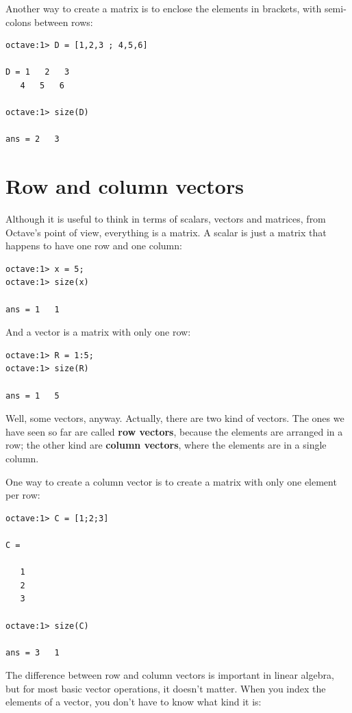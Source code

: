 \documentclass{book}
\begin{document}
Another way to create a matrix is to enclose the elements in
brackets, with semi-colons between rows:

\begin{verbatim}
octave:1> D = [1,2,3 ; 4,5,6]

D = 1   2   3
   4   5   6

octave:1> size(D)

ans = 2   3
\end{verbatim}


\section{Row and column vectors}

Although it is useful to think in terms of scalars, vectors and matrices,
from Octave's point of view, everything is a matrix. A scalar
is just a matrix that happens to have one row and one column:

\begin{verbatim}
octave:1> x = 5;
octave:1> size(x)

ans = 1   1
\end{verbatim}

And a vector is a matrix with only one row:

\begin{verbatim}
octave:1> R = 1:5;
octave:1> size(R)

ans = 1   5
\end{verbatim}

Well, some vectors, anyway. Actually, there are two kind
of vectors. The ones we have seen so far are called {\bf row vectors},
because the elements are arranged in a row; the other kind are
{\bf column vectors}, where the elements are in a single column.

One way to create a column vector is to create a matrix with only
one element per row:

\begin{verbatim}
octave:1> C = [1;2;3]

C =

   1
   2
   3

octave:1> size(C)

ans = 3   1
\end{verbatim}

The difference between row and column vectors is important in
linear algebra, but for
most basic vector operations, it doesn't matter. When you
index the elements of a vector, you don't have to know what kind
it is:
\end{document}
